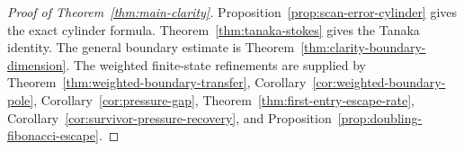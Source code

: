 \begin{proof}[Proof of Theorem~\ref{thm:main-clarity}]
Proposition~\ref{prop:scan-error-cylinder} gives the exact cylinder
formula.  Theorem~\ref{thm:tanaka-stokes} gives the Tanaka identity.
The general boundary estimate is
Theorem~\ref{thm:clarity-boundary-dimension}.  The weighted finite-state
refinements are supplied by
Theorem~\ref{thm:weighted-boundary-transfer},
Corollary~\ref{cor:weighted-boundary-pole},
Corollary~\ref{cor:pressure-gap},
Theorem~\ref{thm:first-entry-escape-rate},
Corollary~\ref{cor:survivor-pressure-recovery},
and Proposition~\ref{prop:doubling-fibonacci-escape}.
\end{proof}
